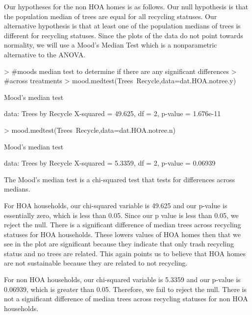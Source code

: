 \documentclass{article}
\begin{document}
Our hypotheses for the non HOA homes is as follows. Our null hypothesis is that the population median of trees are equal for all recycling statuses. Our alternative hypothesis is that at least one of the population medians of trees is different for recycling statuses. Since the plots of the data do not point towards normality, we will use a Mood's Median Test which is a nonparametric alternative to the ANOVA.

\begin{Schunk}
\begin{Sinput}
> #moods median test to determine if there are any significant differences
> #across treatments
> mood.medtest(Trees~Recycle,data=dat.HOA.notree.y)
\end{Sinput}
\begin{Soutput}
	Mood's median test

data:  Trees by Recycle
X-squared = 49.625, df = 2, p-value = 1.676e-11
\end{Soutput}
\begin{Sinput}
> mood.medtest(Trees~Recycle,data=dat.HOA.notree.n)
\end{Sinput}
\begin{Soutput}
	Mood's median test

data:  Trees by Recycle
X-squared = 5.3359, df = 2, p-value = 0.06939
\end{Soutput}
\end{Schunk}

The Mood's median test is a chi-squared test that tests for differences across medians. 

For HOA households, our chi-squared variable is 49.625 and our p-value is essentially zero, which is less than 0.05. Since our p value is less than 0.05, we reject the null. There is a significant difference of median trees across recycling statuses for HOA households. These lowers values of HOA homes then that we see in the plot are significant because they indicate that only trash recycling status and no trees are related. This again points us to believe that HOA homes are not sustainable because they are related to not recycling. 

For non HOA households, our chi-squared variable is 5.3359 and our p-value is 0.06939, which is greater than 0.05. Therefore, we fail to reject the null. There is not a significant difference of median trees across recycling statuses for non HOA households. 
\end{document}
